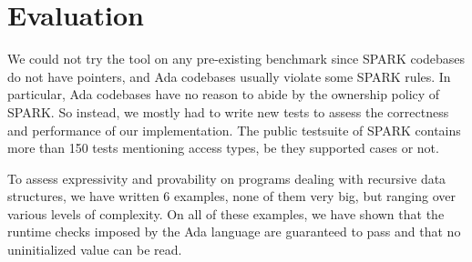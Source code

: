 \documentclass[runningheads]{llncs}
\begin{document}
\section{Evaluation}
We could not try the tool on any pre-existing benchmark since SPARK codebases do not have pointers, and Ada codebases usually violate some SPARK rules. In particular, Ada codebases have no reason to abide by the ownership policy of SPARK. So instead, we mostly had to write new tests to assess the correctness and performance of our implementation.
The public testsuite of SPARK contains more than 150 tests mentioning access types, be they supported cases or not. 

To assess expressivity and provability on programs dealing with recursive data structures, we have written 6 examples, none of them very big, but ranging over various levels of complexity.
%
% 
%
On all of these examples, we have shown that the runtime checks imposed by the Ada language are guaranteed to pass and that no uninitialized value can be read.
\end{document}
